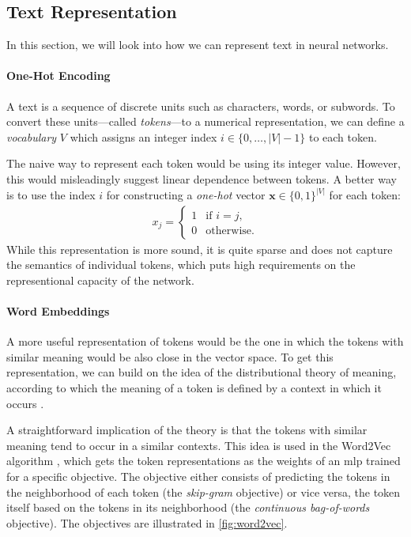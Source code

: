 {\subsection{Text Representation}
\label{sec:text-repr}
In this section, we will look into how we can represent text in neural networks.


\paragraph{One-Hot Encoding}
A text is a sequence of discrete units such as characters, words, or subwords. To convert these units---called \textit{tokens}---to a numerical representation, we can define a \textit{vocabulary} $V$ which assigns an integer index $i \in \{0, \ldots, |V|-1\}$ to each token.

The naive way to represent each token would be using its integer value. However, this would misleadingly suggest linear dependence between tokens. A better way is to use the index $i$ for constructing a \textit{one-hot} vector $\mathbf{x} \in \{0,1\}^{|V|} $ for each token:
\begin{align}
  x_j = \begin{cases}
    1 & \text{if } i = j, \\
    0 & \text{otherwise}.
  \end{cases}
\end{align}
While this representation is more sound, it is quite sparse and does not capture the semantics of individual tokens, which puts high requirements on the representional capacity of the network.

\paragraph{Word Embeddings} A more useful representation of tokens would be the one in which the tokens with similar meaning would be also close in the vector space. To get this representation, we can build on the idea of the distributional theory of meaning, according to which the meaning of a token is defined by a context in which it occurs \cite{harris1954distributional,firth1957synopsis}.

A straightforward implication of the theory is that the tokens with similar meaning tend to occur in a similar contexts. This idea is used in the Word2Vec algorithm \cite{mikolov2013distributed}, which gets the token representations as the weights of an \ac{mlp} trained for a specific objective. The objective either consists of predicting the tokens in the neighborhood of each token (the \emph{skip-gram} objective) or vice versa, the token itself based on the tokens in its neighborhood (the \emph{continuous bag-of-words} objective).  The objectives are illustrated in \autoref{fig:word2vec}.

}
